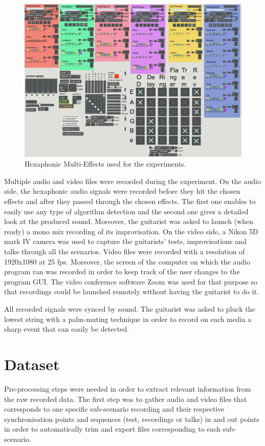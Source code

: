 \documentclass{article}
\begin{document}
\begin{figure}
    \centering
    \includegraphics[scale=0.3]{figures/191025-Patch-experience.png}
    \caption{Hexaphonic Multi-Effects used for the experiments.}
    \label{fig:hex-multi-effects}
\end{figure}

Multiple audio and video files were recorded during the experiment. 
On the audio side, the hexaphonic audio signals were recorded before they hit the chosen effects and after they passed through the chosen effects. The first one enables to easily use any type of algorithm detection and the second one gives a detailed look at the produced sound. Moreover, the guitarist was asked to launch (when ready) a mono mix recording of its improvisation. On the video side, a Nikon 5D mark IV camera was used to capture the guitarists' tests, improvisations and talks through all the scenarios. Video files were recorded with a resolution of 1920x1080 at 25 fps. Moreover, the screen of the computer on which the audio program ran was recorded in order to keep track of the user changes to the program GUI. The video conference software Zoom was used for that purpose so that recordings could be launched remotely without having the guitarist to do it.

All recorded signals were synced by sound. The guitarist was asked to pluck the lowest string with a palm-muting technique in order to record on each media a sharp event that can easily be detected.

\section{Dataset}
Pre-processing steps were needed in order to extract relevant information from the raw recorded data. The first step was to gather audio and video files that corresponds to one specific sub-scenario recording and their respective synchronisation points and sequences (test, recordings or talks) in and out points in order to automatically trim and export files corresponding to each sub-scenario. 
\end{document}
